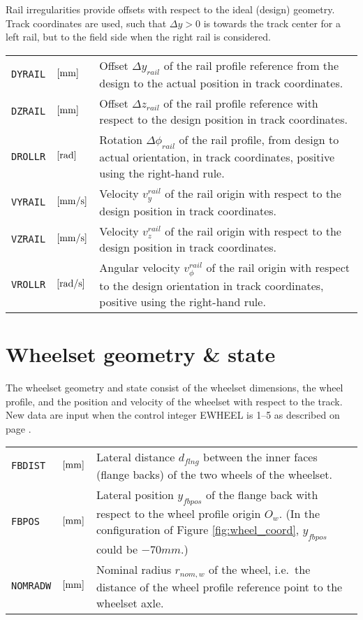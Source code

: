 \documentclass[12pt]{report}
\renewcommand{\magenta}[1]{}
\newenvironment{inputvars}{\vspace{0.4\baselineskip}%

\begin{tabular}{>{\raggedright}p{22mm}p{19mm}p{113mm}}}{
\end{tabular}

}
\newcommand{\inpvar}[3]{{\small\tt #1} & $#2$ & #3 \\[1ex]}
\begin{document}
Rail irregularities provide offsets with respect to the ideal (design)
geometry. Track coordinates are used, such that $\Delta y>0$ is towards
the track center for a left rail, but to the field side when the right rail
is considered.
\begin{inputvars}
\inpvar{DYRAIL}{\bunit{mm}}{Offset $\Delta y_{rail}$ of the rail profile
        reference from the design to the actual position in track coordinates.}
\inpvar{DZRAIL}{\bunit{mm}}{Offset $\Delta z_{rail}$ of the rail profile
        reference with respect to the design position in track coordinates.}
\inpvar{DROLLR}{\bunit{rad}}{Rotation $\Delta \phi_{rail}$ of the rail profile,
        from design to actual orientation, in track coordinates,
        positive using the right-hand rule.}
\inpvar{VYRAIL}{\bunit{mm/s}}{Velocity $v_y^{rail}$ of the rail origin with
        respect to the design position in track coordinates.}
\inpvar{VZRAIL}{\bunit{mm/s}}{Velocity $v_z^{rail}$ of the rail origin with
        respect to the design position in track coordinates.}
\inpvar{VROLLR}{\bunit{rad/s}}{Angular velocity $v_\phi^{rail}$ of the rail
        origin with respect to the design orientation in track coordinates,
        positive using the right-hand rule.}
\end{inputvars}

\magenta{
The massless rail model of Equation (\ref{eq:cntc_defl}) is activated using
control digit ${\tt F}_1=3$, and takes the following inputs:
\begin{inputvars}
\inpvar{KYRAIL}{\bunit{N/mm}}{Effective lateral rail stiffness $k^*_y$.}
\inpvar{FYRAIL}{\bunit{N}}{Prescribed lateral force $F_y^*$ on the rail.}
\inpvar{KZRAIL}{\bunit{N/mm}}{Effective vertical rail stiffness $k^*_z$.}
\inpvar{FZRAIL}{\bunit{N}}{Prescribed vertical force $F_z^*$ on the rail.}
\end{inputvars}
}
 
\section{Wheelset geometry \& state}
\label{sec:wheelset_geom}

The wheelset geometry and state consist of the wheelset dimensions, the
wheel profile, and the position and velocity of the wheelset with respect
to the track. New data are input when the control integer EWHEEL is 1--5
as described on page \pageref{e1-digit}.
\begin{inputvars}
\inpvar{FBDIST}{\bunit{mm}}{Lateral distance $d_{flng}$ between the inner faces
        (flange backs) of the two wheels of the wheelset.}
\inpvar{FBPOS}{\bunit{mm}}{Lateral position $y_{fbpos}$ of the flange back with
        respect to the wheel profile origin $O_w$. (In the configuration of
        Figure \ref{fig:wheel_coord}, $y_{fbpos}$ could be $-70\unit{mm}$.)}
\inpvar{NOMRADW}{\bunit{mm}}{Nominal radius $r_{nom,w}$ of the wheel, i.e.\ the
        distance of the wheel profile reference point to the wheelset axle.}
\end{inputvars}
\end{document}
